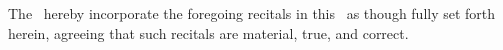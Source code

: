 The \parties\ hereby incorporate the foregoing recitals in this \amendmentTitle\ as though fully set forth herein, agreeing that such recitals are material, true, and correct.

